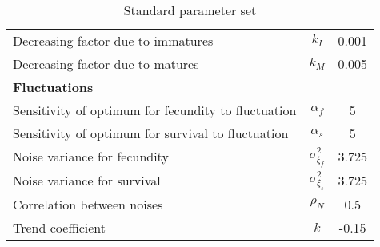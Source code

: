 \begin{table}
\begin{center}
\begin{tabular}{l c c}
		Decreasing factor due to immatures & $k_{I}$ & 0.001 \\
		Decreasing factor due to matures & $k_{M}$ & 0.005 \\
		\multicolumn{3}{l}{\textbf{Fluctuations}} \\
		Sensitivity of optimum for fecundity to fluctuation & $\alpha_{f}$ & 5 \\
		Sensitivity of optimum for survival to fluctuation & $\alpha_{s}$ & 5 \\
		Noise variance for fecundity & $\sigma_{\xi_{f}}^2$ & 3.725 \\
		Noise variance for survival & $\sigma_{\xi_{s}}^2$ & 3.725 \\
		Correlation between noises & $\rho_{N}$ & 0.5 \\
		Trend coefficient & $k$ & -0.15 \\
		\hline \hline
	\end{tabular}
	\caption{Standard parameter set}
	\label{tab:params}
\end{center}
\end{table}

